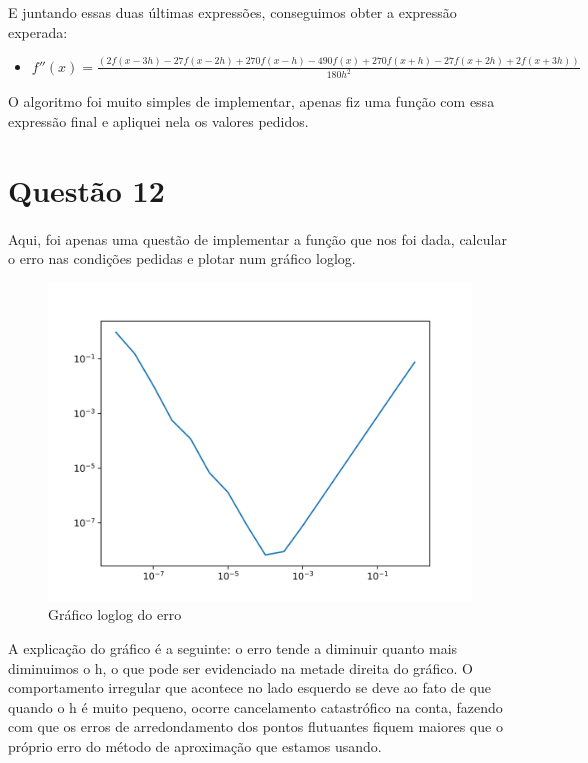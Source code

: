 \documentclass[11pt]{article}
\begin{document}
E juntando essas duas últimas expressões, conseguimos obter a expressão experada: 

\begin{itemize}
\item \(f''(x) = \frac{(2f(x-3h)-27f(x-2h)+270f(x-h)-490f(x)+270f(x+h)-27f(x+2h)+2f(x+3h))}{180h^2}\)
\end{itemize}

O algoritmo foi muito simples de implementar, apenas fiz uma função com essa expressão final e apliquei nela os valores pedidos.

\newpage
\section{Questão 12}
\label{sec:orgbf65cc2}

\paragraph{} Aqui, foi apenas uma questão de implementar a função que nos foi dada, calcular o erro nas condições pedidas e plotar num gráfico loglog.
\begin{figure}[htbp]
\centering
\includegraphics[width=.9\linewidth]{graph.png}
\caption{Gráfico loglog do erro}
\end{figure}

A explicação do gráfico é a seguinte: o erro tende a diminuir quanto mais diminuimos o h, o que pode ser evidenciado na metade direita do gráfico. O comportamento irregular que acontece no lado esquerdo se deve ao fato de que quando o h é muito pequeno, ocorre cancelamento catastrófico na conta, fazendo com que os erros de arredondamento dos pontos flutuantes fiquem maiores que o próprio erro do método de aproximação que estamos usando.
\end{document}
